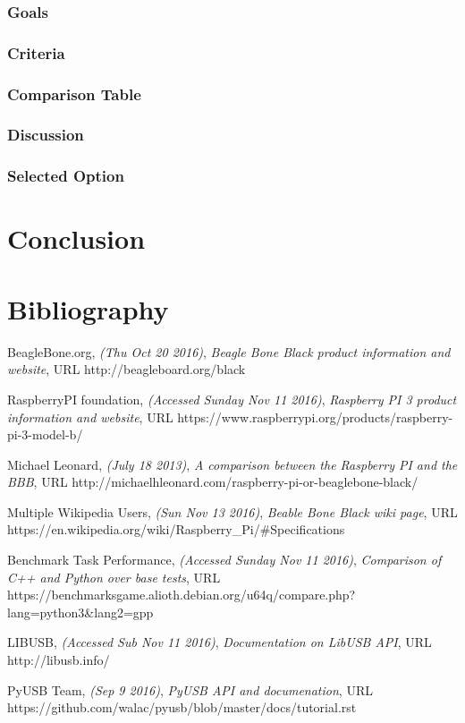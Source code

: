 \documentclass[10pt,draftclsnofoot,onecolumn]{IEEEtran}
\begin{document}
\subsubsection{Goals}
\subsubsection{Criteria}
\subsubsection{Comparison Table}
\subsubsection{Discussion}
\subsubsection{Selected Option}

\section{Conclusion}
\section{Bibliography}
\begin{thebibliography}{9}

 BeagleBone.org,
\emph{(Thu Oct 20 2016)},
  \emph{Beagle Bone Black product information and website},
URL  http://beagleboard.org/black

RaspberryPI foundation,
\emph{(Accessed Sunday  Nov 11 2016)},
  \emph{Raspberry PI 3 product information and website},
URL https://www.raspberrypi.org/products/raspberry-pi-3-model-b/

Michael Leonard,
\emph{(July 18 2013)},
  \emph{A comparison between the Raspberry PI and the BBB},
URL  http://michaelhleonard.com/raspberry-pi-or-beaglebone-black/ 

Multiple Wikipedia Users,
\emph{(Sun Nov 13 2016)},
  \emph{Beable Bone Black wiki page},
URL https://en.wikipedia.org/wiki/Raspberry\_Pi/\#Specifications 

 Benchmark Task Performance,
\emph{(Accessed Sunday  Nov 11 2016)},
 \emph{Comparison of C++ and Python over base tests},
URL   https://benchmarksgame.alioth.debian.org/u64q/compare.php?lang=python3\&lang2=gpp  

LIBUSB,
\emph{(Accessed Sub Nov 11 2016)},
  \emph{Documentation on LibUSB API},
URL http://libusb.info/

PyUSB Team,
\emph{(Sep 9 2016)},
  \emph{PyUSB API and documenation},
URL https://github.com/walac/pyusb/blob/master/docs/tutorial.rst

\end{thebibliography}
\end{document}
